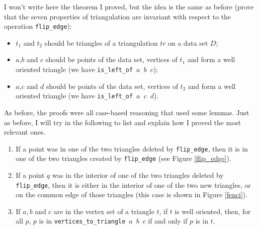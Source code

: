 \documentclass[a4paper,10pt]{article}
\begin{document}
I won't write here the theorem I proved, but the idea is the same as before (prove that the seven properties of triangulation are invariant with respect to the operation {\tt flip\_edge}):
\begin{itemize}
\item $t_1$ and $t_2$ should be triangles of a triangulation $tr$ on a data set $D$;
\item $a$,$b$ and $c$ should be points of the data set, vertices of $t_1$ and form a well oriented triangle (we have {\tt is\_left\_of $a$ $b$ $c$});
\item $a$,$c$ and $d$ should be points of the data set, vertices of $t_2$ and form a well oriented triangle (we have {\tt is\_left\_of $a$ $c$ $d$}).
\end{itemize}

As before, the proofs were all case-based reasoning that used some lemmas. Just as before, I will try in the following to list and explain how I proved the most relevant ones.
\begin{enumerate}
\item If a point was in one of the two triangles deleted by {\tt flip\_edge}, then it is in one of the two triangles created by {\tt flip\_edge} (see Figure \ref{flip_edge}).
\item If a point $q$ was in the interior of one of the two triangles deleted by {\tt flip\_edge}, then it is either in the interior of one of the two new triangles, or on the common edge of those triangles (this case is shown in Figure \ref{fenci}).
\item If $a,b$ and $c$ are in the vertex set of a triangle $t$, if $t$ is well oriented, then, for all $p$, $p$ is in {\tt vertices\_to\_triangle $a$ $b$ $c$} if and only if $p$ is in $t$.
\end{enumerate}
\end{document}
